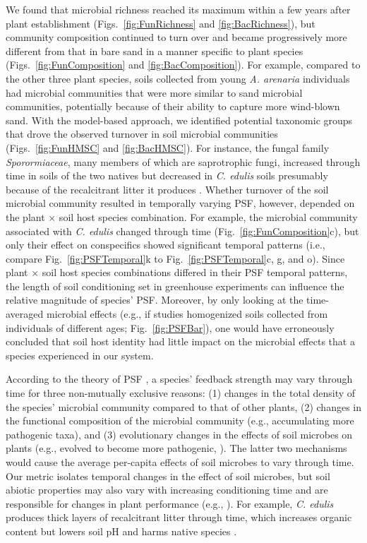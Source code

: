 We found that microbial richness reached its maximum within a few years after plant establishment (Figs.~\ref{fig:FunRichness} and \ref{fig:BacRichness}), but community composition continued to turn over and became progressively more different from that in bare sand in a manner specific to plant species (Figs.~\ref{fig:FunComposition} and \ref{fig:BacComposition}). 
For example, compared to the other three plant species, soils collected from young \textit{A. arenaria} individuals had microbial communities that were more similar to sand microbial communities, potentially because of their ability to capture more wind-blown sand.
With the model-based approach, we identified potential taxonomic groups that drove the observed turnover in soil microbial communities (Figs.~\ref{fig:FunHMSC} and \ref{fig:BacHMSC}). For instance, the fungal family \textit{Sporormiaceae}, many members of which are saprotrophic fungi, increased through time in soils of the two natives but decreased in \textit{C. edulis} soils presumably because of the recalcitrant litter it produces \citep{Novoa2014}.
Whether turnover of the soil microbial community resulted in temporally varying PSF, however, depended on the plant $\times$ soil host species combination. For example, the microbial community associated with \textit{C. edulis} changed through time (Fig.~\ref{fig:FunComposition}c), but only their effect on conspecifics showed significant temporal patterns (i.e., compare Fig.~\ref{fig:PSFTemporal}k to Fig.~\ref{fig:PSFTemporal}c, g, and o).
Since plant $\times$ soil host species combinations differed in their PSF temporal patterns, the length of soil conditioning set in greenhouse experiments can influence the relative magnitude of species' PSF.
Moreover, by only looking at the time-averaged microbial effects (e.g., if studies homogenized soils collected from individuals of different ages; Fig.~\ref{fig:PSFBar}), one would have erroneously concluded that soil host identity had little impact on the microbial effects that a species experienced in our system.
\par


According to the theory of PSF \citep{Bever1997}, a species' feedback strength may vary through time for three non-mutually exclusive reasons: (1) changes in the total density of the species' microbial community compared to that of other plants, (2) changes in the functional composition of the microbial community (e.g., accumulating more pathogenic taxa), and (3) evolutionary changes in the effects of soil microbes on plants (e.g., evolved to become more pathogenic, \citealp{Dostal2013, Packer2004}). The latter two mechanisms would cause the average per-capita effects of soil microbes to vary through time.
Our metric isolates temporal changes in the effect of soil microbes, but soil abiotic properties may also vary with increasing conditioning time and are responsible for changes in plant performance (e.g., \citealp{Lepinay2018}). For example, \textit{C. edulis} produces thick layers of recalcitrant litter through time, which increases organic content but lowers soil pH and harms native species \citep{Conser2009, Novoa2014}. 
\par



